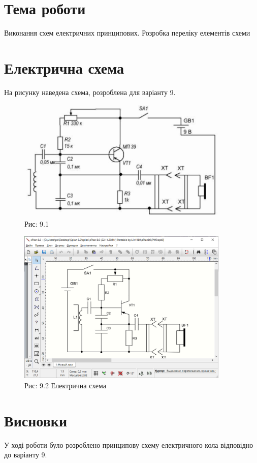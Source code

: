 \documentclass[a4paper]{article}
\begin{document}
\section*{Тема роботи}
 Виконання схем електричних принципових. Розробка переліку елементів схеми 
 
\section*{Електрична схема}
На рисунку наведена схема, розроблена для варіанту 9.

\begin{figure}[h]
    \centering
    \includegraphics[width=0.9\textwidth]{imgs/PW9.1.png}
    \caption*{Рис: 9.1}
\end{figure}

\newpage

\begin{figure}[h]
    \centering
    \includegraphics[width=0.9\textwidth]{imgs/PW9.2.png}
    \caption*{Рис: 9.2 Електрична схема}
\end{figure}

\section*{Висновки}
У ході роботи було розроблено принципову схему електричного кола відповідно до варіанту 9.
\end{document}
